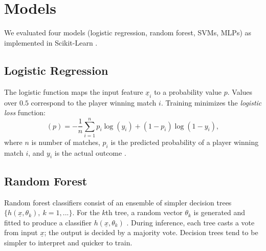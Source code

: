 \section{Models} \label{sec:models}

We evaluated four models (logistic regression, random forest, SVMs, MLPs) as implemented in  Scikit-Learn  \cite{pedregosa2011scikit}.

\subsection{Logistic Regression}
The logistic function maps the input feature $\underline{x}_i$ to a probability value $p$. Values over $0.5$ correspond to the player winning match $i$.  Training minimizes the \textit{logistic loss} function:
\begin{equation}
    (p) = -\frac{1}{n} \sum_{i=1}^n p_i \log(y_i) + (1-p_i)\log(1-y_i), 
\end{equation}
where $n$ is number of matches, $p_i$ is the predicted probability of a player winning match $i$, and  $y_i$ is the actual outcome \cite{hazan2014logistic}. 


\subsection{Random Forest}
Random forest classifiers consist of an ensemble of simpler decision trees $\{h(\underline{x},\theta_k),\ k=1,...\}$. %
For the $k$th tree, a random vector $\theta_k$ is generated and fitted to produce a classifier $h(\underline{x}, \theta_k)$ \cite{breiman2001random}. During inference, each tree  casts a vote from input $\underline{x}$; the output is decided by a majority vote. Decision trees tend to be simpler to interpret and quicker to train.

